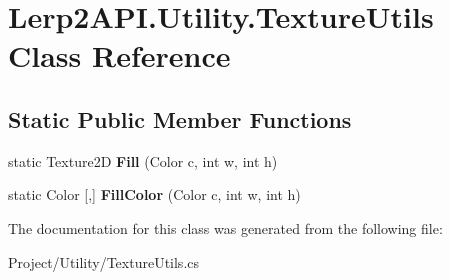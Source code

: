 \hypertarget{class_lerp2_a_p_i_1_1_utility_1_1_texture_utils}{}\section{Lerp2\+A\+P\+I.\+Utility.\+Texture\+Utils Class Reference}
\label{class_lerp2_a_p_i_1_1_utility_1_1_texture_utils}
\subsection*{Static Public Member Functions}
\begin{DoxyCompactItemize}
\item 
\mbox{\label{class_lerp2_a_p_i_1_1_utility_1_1_texture_utils_a022fee05fce5d493f8cec2a49d1b6a89}} 
static Texture2D {\bfseries Fill} (Color c, int w, int h)
\item 
\mbox{\label{class_lerp2_a_p_i_1_1_utility_1_1_texture_utils_a2526ea7dc2a06b4d8eb78eeb6521de15}} 
static Color \mbox{[},\mbox{]} {\bfseries Fill\+Color} (Color c, int w, int h)
\end{DoxyCompactItemize}


The documentation for this class was generated from the following file\+:\begin{DoxyCompactItemize}
\item 
Project/\+Utility/Texture\+Utils.\+cs\end{DoxyCompactItemize}
